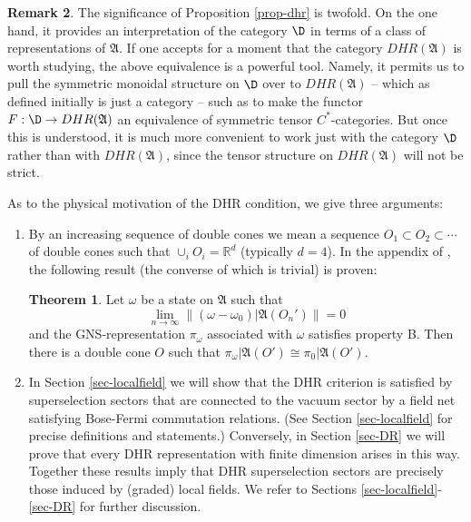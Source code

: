 \documentclass[11pt]{article}
\newcommand{\alg}[1]{\mathfrak{#1}}
\theoremstyle{definition}
\newtheorem{thm}{Theorem}[section]
\theoremstyle{definition}
\newtheorem{note}[thm]{Remark}
\theoremstyle{remark}
\def\7#1{{\mathbb #1}}
\begin{document}
\begin{note} \label{note-dhr} The significance of Proposition
  \ref{prop-dhr} is twofold. On the one hand, it provides an
  interpretation of the category $\D$ in terms of a class of
  representations of $\alg{A}$. If one accepts for a moment that the
  category $DHR(\alg{A})$ is worth studying, the above equivalence is
  a powerful tool. Namely, it permits us to pull the symmetric
  monoidal structure on $\D$ over to $DHR(\alg{A})$ -- which as
  defined initially is just a category -- such as to make the functor
  $F:\D\to DHR(\alg{A})$ an equivalence of symmetric tensor
  $C^*$-categories.  But once this is understood, it is much more
  convenient to work just with the category $\D$ rather than with
  $DHR(\alg{A})$, since the tensor structure on $DHR(\alg{A})$ will
  not be strict.

  As to the physical motivation of the DHR condition,
  we give three arguments:

\begin{enumerate}
\item By an increasing sequence of double cones we mean
  a sequence $O_1\subset O_2\subset \cdots $ of double
  cones such that $\cup_i O_i=\7R^d$ (typically
  $d=4$). In the appendix of \cite{dhr3}, the following
  result (the converse of which is trivial) is proven:

\begin{thm}
Let $\omega$ be a state on $\alg{A}$ such that 
\[ \lim_{n\to\infty}\|(\omega-\omega_0)|\alg{A}(O_n')\|=0 \]
and the GNS-representation $\pi_\omega$ associated with $\omega$ satisfies property B. Then there is
a double cone $O$ such that $\pi_\omega|\alg{A}(O')\cong\pi_0|\alg{A}(O')$.
\end{thm}

\item In Section \ref{sec-localfield} we will show that
  the DHR criterion is satisfied by superselection
  sectors that are connected to the vacuum sector by a
  field net satisfying Bose-Fermi commutation
  relations. (See Section \ref{sec-localfield} for
  precise definitions and statements.)  Conversely, in
  Section \ref{sec-DR} we will prove that every DHR
  representation with finite dimension arises in this
  way. Together these results imply that DHR
  superselection sectors are precisely those induced by
  (graded) local fields. We refer to Sections
  \ref{sec-localfield}-\ref{sec-DR} for further
  discussion.


\end{enumerate}
\end{note}
\end{document}
